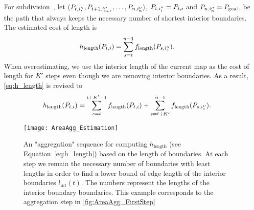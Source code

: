 For subdivision~\Pnode, let
$(P_{t,i''_t}, P_{t+1,i''_{t+1}}, \dots,P_{n,i''_n})$, 
$P_{t,i''_t}=P_{t,i}$ and $P_{n,i''_n}=P_\mathrm{goal}$,
be the path that always keeps 
the necessary number of shortest interior boundaries.
The estimated cost of length is
\begin{equation}
\label{eq:h_length}
h_\mathrm{length}(P_{t,i})=
\sum_{s=t}^{n-1}f_\mathrm{length}(P_{s,i''_s}).
\end{equation}
When overestimating,
we use the interior length of the current map as the cost of 
length for $K'$ steps even though we are removing 
interior boundaries.
As a result, \fo\ref{eq:h_length} is revised to
\begin{equation}
\label{eq:o_length}
h_\mathrm{length}(P_{t,i})=
\sum_{s=t}^{t+K'-1}f_\mathrm{length}(P_{t,i})+
\sum_{s=t+K'}^{n-1}f_\mathrm{length}(P_{s,i''_s}).
\end{equation}






\begin{figure*}[htb]
	\centering
	\texttt{[image: AreaAgg\_Estimation]}
	\caption{An "aggregation" sequence for computing 
		$h_\mathrm{length}$ 
		(see Equation~\ref{eq:h_length}) 
		based on the length of boundaries. 
		At each step we remain the necessary number 
		of boundaries with least lengths in order to find a 
		lower bound of edge length of the interior boundaries 
		$l_\mathrm{int}(t)$. 
		The numbers represent the 
		lengths of the interior boundary boundaries.
		This example corresponds to the aggregation step in 
		\fig\ref{fig:AreaAgg_FirstStep}
	}
	\label{fig:AreaAgg_h_length}
\end{figure*}


